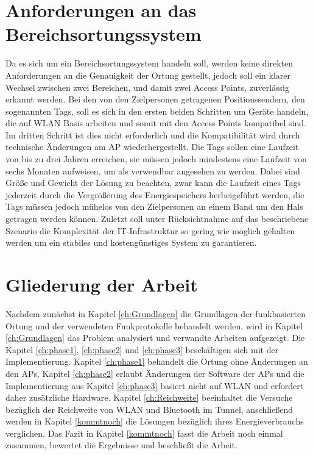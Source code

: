 \section{Anforderungen an das Bereichsortungssystem}
\label{ch:Einleitung:sec:Anforderungen}
Da es sich um ein Bereichsortungssystem handeln soll, werden keine direkten Anforderungen an die Genauigkeit der Ortung gestellt, jedoch soll ein klarer Wechsel zwischen zwei Bereichen, und damit zwei Access Points, zuverlässig erkannt werden. 
Bei den von den Zielpersonen getragenen Positionssendern, den sogenannten Tags, soll es sich in den ersten beiden Schritten um Geräte handeln, die auf WLAN Basis arbeiten und somit mit den Access Points kompatibel sind.
Im dritten Schritt ist dies nicht erforderlich und die Kompatibilität wird durch technische Änderungen am AP wiederhergestellt.
Die Tags sollen eine Laufzeit von bis zu drei Jahren erreichen, sie müssen jedoch mindestens eine Laufzeit von sechs Monaten aufweisen, um als verwendbar angesehen zu werden. 
Dabei sind Größe und Gewicht der Lösung zu beachten, zwar kann die Laufzeit eines Tags jederzeit durch die Vergrößerung des Energiespeichers herbeigeführt werden, die Tags müssen jedoch mühelos von den Zielpersonen an einem Band um den Hals getragen werden können.
Zuletzt soll unter Rücksichtnahme auf das beschriebene Szenario die Komplexität der IT-Infrastruktur so gering wie möglich gehalten werden um ein stabiles und kostengünstiges System zu garantieren. 


\section{Gliederung der Arbeit}
\label{ch:Einleitung:sec:Gliederung}
Nachdem zunächst in Kapitel \ref{ch:Grundlagen} die Grundlagen der funkbasierten Ortung und der verwendeten Funkprotokolle behandelt werden, wird in Kapitel \ref{ch:Grundlagen} das Problem analysiert und verwandte Arbeiten aufgezeigt.
Die Kapitel \ref{ch:phase1}, \ref{ch:phase2} und \ref{ch:phase3} beschäftigen sich mit der Implementierung. 
Kapitel \ref{ch:phase1} behandelt die Ortung ohne Änderungen an den APs, Kapitel \ref{ch:phase2} erlaubt Änderungen der Software der APs und die Implementierung aus Kapitel \ref{ch:phase3} basiert nicht auf WLAN und erfordert daher zusätzliche Hardware.
Kapitel \ref{ch:Reichweite} beeinhaltet die Versuche bezüglich der Reichweite von WLAN und Bluetooth im Tunnel, anschließend werden in Kapitel \ref{kommtnoch} die Lösungen bezüglich ihres Energieverbrauchs verglichen.
Das Fazit in Kapitel \ref{kommtnoch} fasst die Arbeit noch einmal zusammen, bewertet die Ergebnisse und beschließt die Arbeit.
